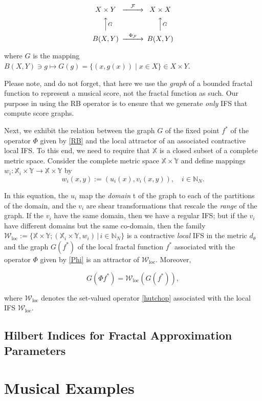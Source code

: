 \documentclass[english,11pt,letterpaper,onecolumn]{scrartcl}
\numberwithin{equation}{section}
\newcommand{\st}{\,|\,}
\newcommand{\N}{\mathbb{N}}
\newcommand{\X}{\mathbb{X}}
\newcommand{\Y}{\mathbb{Y}}
\newcommand{\cF}{\mathcal{F}}
\newcommand{\cW}{\mathcal{W}}
\newcommand{\be}{\begin{equation}}
\newcommand{\ee}{\end{equation}}
\newcommand{\loc}{\mathrm{loc}}
\begin{document}
\be\label{Phi}
\begin{CD}
X\times Y @>\cF>> X\times X\\
@AAGA                  @AAGA\\
B(X,Y) @>\Phi_\cF>>  B(X,Y)
\end{CD}
\ee

\noindent where $G$ is the mapping $B(X,Y)\ni g\longmapsto G(g) = \{(x,
g(x))\mid x\in X\}\in X\times Y$.

Please note, and do not forget, that here we use the \textit{graph} of a bounded
fractal function to represent a musical score, not the fractal function as such.
Our purpose in using the RB operator is to ensure that we generate \textit{only}
IFS that compute score graphs.

Next, we exhibit the relation between the graph $G$ of the fixed point $f^*$ of
the operator $\Phi$ given by \eqref{RB} and the local attractor of an associated
contractive local IFS. To this end, we need to require that $\X$ is a closed
subset of a complete metric space. Consider the complete metric space
$\X\times\Y$ and define mappings $w_i:\X_i\times\Y\to\X\times\Y$ by \[ w_i (x,
y) := (u_i (x), v_i (x,y)), \quad i\in \N_N. \]

In this equation, the $u_i$ map the \emph{domain} t of the graph to each of the
partitions of the domain, and the $v_i$ are shear transformations that rescale
the \emph{range} of the graph. If the $v_i$ have the same domain, then we have a
regular IFS; but if the $v_i$ have different domains but the same co-domain,
then the family $\cW_\loc := \{\X\times\Y; (\X_i\times\Y, w_i)\st i\in \N_N\}$
is a contractive \textit{local} IFS in the metric $d_\theta$ and the graph
$G(f^*)$ of the local fractal function $f^*$ associated with the operator $\Phi$
given by \eqref{Phi} is an attractor of $\cW_\loc$. Moreover,

\be\label{GW}
G(\Phi f^*) = \cW_\loc (G(f^*)),
\ee

where $\cW_\loc$ denotes the set-valued operator \eqref{hutchop} associated with
the local IFS $\cW_\loc$.

\subsection{Hilbert Indices for Fractal Approximation Parameters}

\section{Musical Examples}
\end{document}
